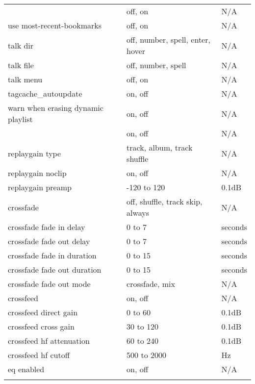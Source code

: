 \begin{center}
\begin{longtable}{@{}>{\raggedright}p{}@{}>{\raggedright}p{}@{}p{}@{}}
                    & off, on           & N/A\\
    use most-recent-bookmarks
                    & off, on           & N/A\\
    talk dir        & off, number, spell, enter, hover
                                        & N/A\\
    talk file       & off, number, spell& N/A\\
    talk menu       & off, on           & N/A\\
    tagcache\_autoupdate
                    & on, off           & N/A\\
    warn when erasing dynamic playlist
                    & on, off           & N/A\\
%
    \opt{SWCODEC}{
      replaygain    & on, off           & N/A\\
      replaygain type
                    & track, album, track shuffle
                                        & N/A\\
      replaygain noclip
                    & on, off           & N/A\\
      replaygain preamp
                    & -120 to 120       & 0.1dB\\
%
      crossfade     & off, shuffle, track skip, always
                                        & N/A\\
      crossfade fade in delay
                    & 0 to 7            & seconds\\
      crossfade fade out delay
                    & 0 to 7            & seconds\\
      crossfade fade in duration
                    & 0 to 15           & seconds\\
      crossfade fade out duration
                    & 0 to 15           & seconds\\
      crossfade fade out mode
                    & crossfade, mix    & N/A\\
%
      crossfeed     & on, off           & N/A\\
      crossfeed direct gain
                    & 0 to 60           & 0.1dB\\
      crossfeed cross gain
                    & 30 to 120         & 0.1dB\\
      crossfeed hf attenuation
                    & 60 to 240         & 0.1dB\\
      crossfeed hf cutoff
                    & 500 to 2000       & Hz\\
%
      eq enabled    & on, off           & N/A\\
}
\end{longtable}
\end{center}
